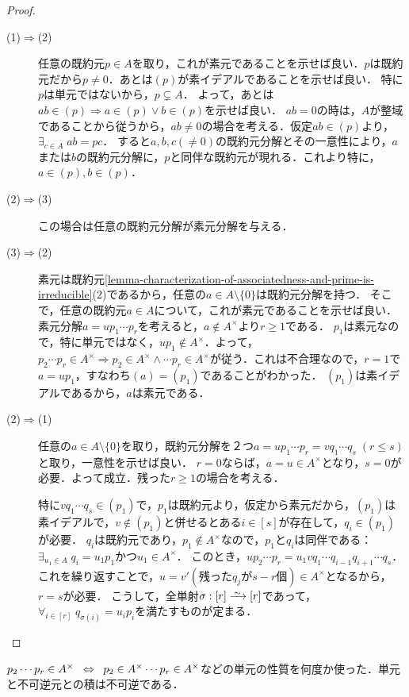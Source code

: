 \documentclass[uplatex,dvipdfmx]{jsreport}
\begin{document}
\begin{proof}\mbox{}
    \begin{description}
        \item[(1)$\Rightarrow$(2)] 
        任意の既約元$p\in A$を取り，これが素元であることを示せば良い．$p$は既約元だから$p\ne 0$．あとは$(p)$が素イデアルであることを示せば良い．
        特に$p$は単元ではないから，$p\subsetneq A$．
        よって，あとは$ab\in(p)\Rightarrow a\in(p)\lor b\in(p)$を示せば良い．
        $ab=0$の時は，$A$が整域であることから従うから，$ab\ne 0$の場合を考える．仮定$ab\in (p)$より，$\exists_{c\in A}\;ab=pc$．
        すると$a,b,c(\ne 0)$の既約元分解とその一意性により，$a$または$b$の既約元分解に，$p$と同伴な既約元が現れる．これより特に，$a\in(p),b\in(p)$．
        \item[(2)$\Rightarrow$(3)] この場合は任意の既約元分解が素元分解を与える．
        \item[(3)$\Rightarrow$(2)]
        素元は既約元\ref{lemma-characterization-of-associatedness-and-prime-is-irreducible}(2)であるから，任意の$a\in A\setminus\{0\}$は既約元分解を持つ．
        そこで，任意の既約元$a\in A$について，これが素元であることを示せば良い．素元分解$a=up_1\cdots p_r$を考えると，$a\notin A^\times$より$r\ge 1$である．
        $p_1$は素元なので，特に単元ではなく，$up_1\notin A^\times$．よって，$p_2\cdots p_r\in A^\times\Rightarrow p_2\in A^\times\land\cdots p_r\in A^\times$が従う．これは不合理なので，$r=1$で$a=up_1$，すなわち$(a)=(p_1)$であることがわかった．
        $(p_1)$は素イデアルであるから，$a$は素元である．
        \item[(2)$\Rightarrow$(1)]
        任意の$a\in A\setminus\{0\}$を取り，既約元分解を２つ$a=up_1\cdots p_r=vq_1\cdots q_s\;(r\le s)$と取り，一意性を示せば良い．
        $r=0$ならば，$a=u\in A^\times$となり，$s=0$が必要．よって成立．残った$r\ge 1$の場合を考える．

        特に$vq_1\cdots q_s\in(p_1)$で，$p_1$は既約元より，仮定から素元だから，$(p_1)$は素イデアルで，$v\notin(p_1)$と併せるとある$i\in[s]$が存在して，$q_i\in(p_1)$が必要．
        $q_i$は既約元であり，$p_1\notin A^\times$なので，$p_1$と$q_i$は同伴である：$\exists_{u_1\in A}\;q_i=u_1p_1$かつ$u_1\in A^\times$．
        このとき，$up_2\cdots p_r=u_1vq_1\cdots q_{i-1}q_{i+1}\cdots q_s$．これを繰り返すことで，$u=v'(残ったq_jがs-r個)\in A^\times$となるから，$r=s$が必要．
        こうして，全単射$\sigma:[r]\iso[r]$であって，$\forall_{i\in[r]}\;q_{\sigma(i)}=u_ip_i$を満たすものが定まる．
    \end{description}
\end{proof}
\begin{remarks}
    $p_2\cdots p_r\in A^\times\;\;\Leftrightarrow\;\; p_2\in A^\times\cdots p_r\in A^\times$などの単元の性質を何度か使った．単元と不可逆元との積は不可逆である．
\end{remarks}
\end{document}
